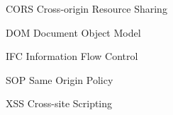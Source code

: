 %
%

%
%




%
%
%

{\SingleSpacing
{}
\listoffigures*
\cleardoublepage
}

{\SingleSpacing
	\lstlistoflistings*
	\cleardoublepage
}



%
\begin{siglas}
  \item[CORS] Cross-origin Resource Sharing
  \item[DOM] Document Object Model
  \item[IFC] Information Flow Control
  \item[SOP] Same Origin Policy
  \item[XSS] Cross-site Scripting
\end{siglas}

